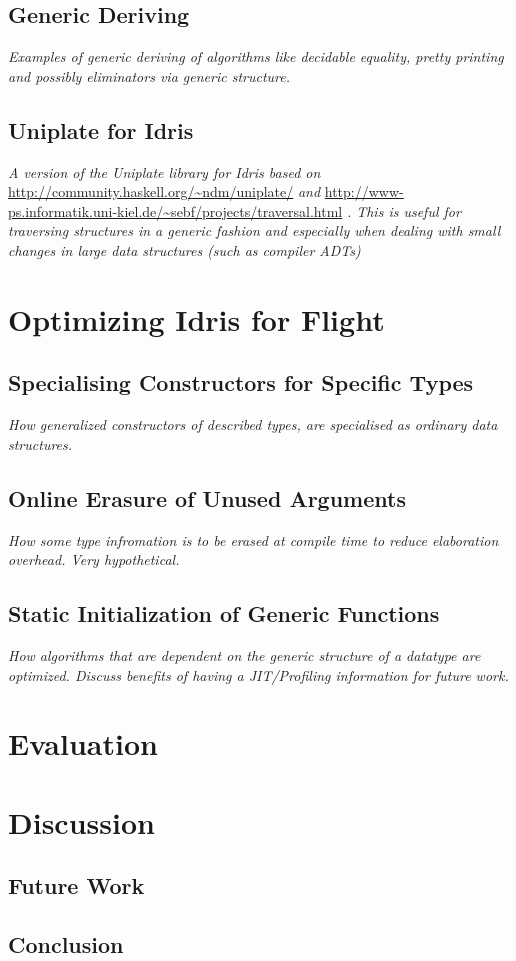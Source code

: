 \documentclass{ituthesis}
\begin{document}
\section{Generic Deriving}
\label{sec:GenericDeriving}
\textit{Examples of generic deriving of algorithms like decidable equality, pretty printing and possibly eliminators via generic structure.}

\section{Uniplate for Idris}
\label{sec:UniplateforIdris}
\textit{A version of the Uniplate library for Idris based on} \url{http://community.haskell.org/~ndm/uniplate/} \textit{and} \url{http://www-ps.informatik.uni-kiel.de/~sebf/projects/traversal.html} \textit{.
This is useful for traversing structures in a generic fashion and especially when dealing with small changes in large data structures (such as compiler ADTs)}

\chapter{Optimizing Idris for Flight}
\label{cha:OptimizingIdrisforFlight}

\section{Specialising Constructors for Specific Types}
\label{sec:SpecialisingConstructorsforSpecificTypes}
\textit{How generalized constructors of described types, are specialised as ordinary data structures.}

\section{Online Erasure of Unused Arguments}
\label{sec:OnlineErasureofUnusedArguments}
\textit{How some type infromation is to be erased at compile time to reduce elaboration overhead. Very hypothetical.}

\section{Static Initialization of Generic Functions}
\label{sec:StaticInitializationofGenericFunctions}
\textit{How algorithms that are dependent on the generic structure of a datatype are optimized. Discuss benefits of having a JIT/Profiling information for future work.}

\chapter{Evaluation}
\label{cha:Evaluation}

\chapter{Discussion}
\label{cha:Discussion}

\section{Future Work}
\label{sec:FutureWork}

\section{Conclusion}
\label{sec:Conclusion}

\appendix

\end{document}
